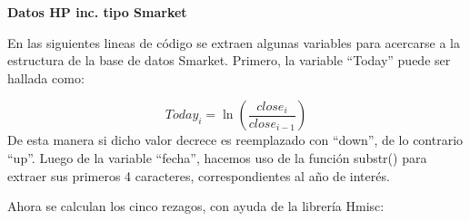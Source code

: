 \documentclass[
]{article}
\newenvironment{Shaded}{\begin{snugshade}}{\end{snugshade}}
\newcommand{\ControlFlowTok}[1]{\textcolor[rgb]{0.13,0.29,0.53}{\textbf{#1}}}
\newcommand{\DecValTok}[1]{\textcolor[rgb]{0.00,0.00,0.81}{#1}}
\newcommand{\KeywordTok}[1]{\textcolor[rgb]{0.13,0.29,0.53}{\textbf{#1}}}
\newcommand{\NormalTok}[1]{#1}
\newcommand{\OperatorTok}[1]{\textcolor[rgb]{0.81,0.36,0.00}{\textbf{#1}}}
\newcommand{\StringTok}[1]{\textcolor[rgb]{0.31,0.60,0.02}{#1}}
\begin{document}
\textbf{Datos HP inc. tipo Smarket}

En las siguientes lineas de código se extraen algunas variables para
acercarse a la estructura de la base de datos Smarket. Primero, la
variable ``Today'' puede ser hallada como:

\[Today_{i}=\ln \left(\frac{close_{i}}{close_{i-1}}\right)\] De esta
manera si dicho valor decrece es reemplazado con ``down'', de lo
contrario ``up''. Luego de la variable ``fecha'', hacemos uso de la
función substr() para extraer sus primeros 4 caracteres,
correspondientes al año de interés.

\begin{Shaded}
\end{Shaded}

Ahora se calculan los cinco rezagos, con ayuda de la librería Hmisc:

\begin{Shaded}
\end{Shaded}
\end{document}

